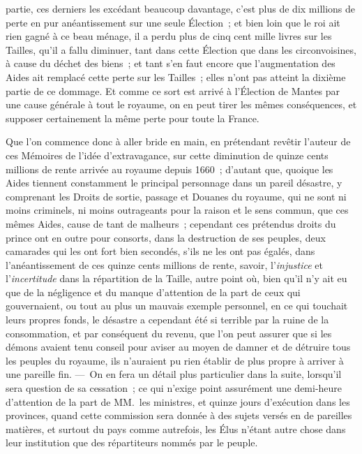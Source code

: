 \documentclass[french,twoside]{book} %
\begin{document}
partie, ces derniers les excédant beaucoup davantage, c’est plus de dix millions de perte en pur anéantissement sur une seule Élection ; et bien loin que le roi ait rien gagné à ce beau ménage, il a perdu plus de cinq cent mille livres sur les Tailles, qu’il a fallu diminuer, tant dans cette Élection que dans les circonvoisines, à cause du déchet des biens ; et tant s’en faut encore que l’augmentation des Aides ait remplacé cette perte sur les Tailles ; elles n’ont pas atteint la dixième partie de ce dommage. Et comme ce sort est arrivé à l’Élection de Mantes par une cause générale à tout le royaume, on en peut tirer les mêmes conséquences, et supposer certainement la même perte pour toute la France.\par
Que l’on commence donc à aller bride en main, en prétendant revêtir l’auteur de ces Mémoires de l’idée d’extravagance, sur cette diminution de quinze cents millions de rente arrivée au royaume depuis 1660 ; d’autant que, quoique les Aides tiennent constamment le principal personnage dans un pareil désastre, y comprenant les Droits de sortie, passage et Douanes du royaume, qui ne sont ni moins criminels, ni moins outrageants pour la raison et le sens commun, que ces mêmes Aides, cause de tant de malheurs ; cependant ces prétendus droits du prince ont en outre pour consorts, dans la destruction de ses peuples, deux camarades qui les ont fort bien secondés, s’ils ne les ont pas égalés, dans l’anéantissement de ces quinze cents millions de rente, savoir, l’{\itshape injustice} et l’{\itshape incertitude} dans la répartition de la Taille, autre point où, bien qu’il n’y ait eu que de la négligence et du manque d’attention de la part de ceux qui gouvernaient, ou tout au plus un mauvais exemple personnel, en ce qui touchait leurs propres fonds, le désastre a cependant été si terrible par la ruine de la consommation, et par conséquent du revenu, que l’on peut assurer que si les démons avaient tenu conseil pour aviser au moyen de damner et de détruire tous les peuples du royaume, ils n’auraient pu rien établir de plus propre à arriver à une pareille fin. — On en fera un détail plus particulier dans la suite, lorsqu’il sera question de sa cessation ; ce qui n’exige point assurément une demi-heure d’attention de la part de MM. les ministres, et quinze jours d’exécution dans les provinces, quand cette commission sera donnée à des sujets versés en de pareilles matières, et surtout du pays comme autrefois, les Élus n’étant autre chose dans leur institution que des répartiteurs nommés par le peuple.\par
\end{document}
